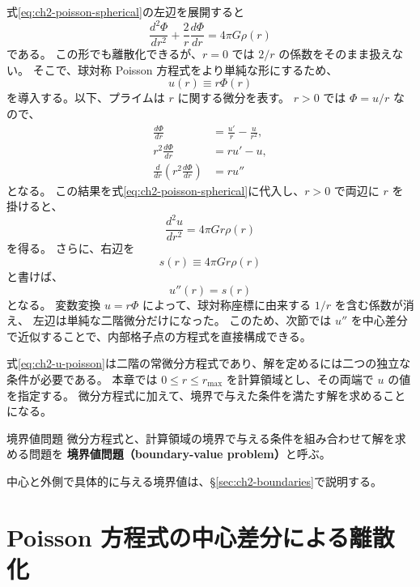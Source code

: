 式\eqref{eq:ch2-poisson-spherical}の左辺を展開すると
\begin{equation}
 \frac{d^2\Phi}{dr^2}
 +\frac{2}{r}\frac{d\Phi}{dr}
 =4\pi G\rho(r)
\end{equation}
である。
この形でも離散化できるが、$r=0$ では $2/r$ の係数をそのまま扱えない。
そこで、球対称 Poisson 方程式をより単純な形にするため、
\begin{equation}
 u(r)\equiv r\Phi(r)
\label{eq:ch2-u-def}
\end{equation}
を導入する。以下、プライムは $r$ に関する微分を表す。
$r>0$ では $\Phi=u/r$ なので、
\begin{align}
 \frac{d\Phi}{dr}
 &=\frac{u'}{r}-\frac{u}{r^2},\\
 r^2\frac{d\Phi}{dr}
 &=ru'-u,\\
 \frac{d}{dr}\left(r^2\frac{d\Phi}{dr}\right)
 &=ru''
\end{align}
となる。
この結果を式\eqref{eq:ch2-poisson-spherical}に代入し、$r>0$ で両辺に $r$ を掛けると、
\begin{equation}
 \frac{d^2u}{dr^2}=4\pi G r\rho(r)
\end{equation}
を得る。
さらに、右辺を
\begin{equation}
 s(r)\equiv4\pi G r\rho(r)
\label{eq:ch2-source-def}
\end{equation}
と書けば、
\begin{equation}
\boxed{
 u''(r)=s(r)
 }
\label{eq:ch2-u-poisson}
\end{equation}
となる。
変数変換 $u=r\Phi$ によって、球対称座標に由来する $1/r$ を含む係数が消え、
左辺は単純な二階微分だけになった。
このため、次節では $u''$ を中心差分で近似することで、内部格子点の方程式を直接構成できる。

式\eqref{eq:ch2-u-poisson}は二階の常微分方程式であり、解を定めるには二つの独立な条件が必要である。
本章では $0\le r\le r_{\max}$ を計算領域とし、その両端で $u$ の値を指定する。
微分方程式に加えて、境界で与えた条件を満たす解を求めることになる。

\begin{definitionbox}{境界値問題}
微分方程式と、計算領域の境界で与える条件を組み合わせて解を求める問題を
\textbf{境界値問題（boundary-value problem）}と呼ぶ。
\end{definitionbox}

中心と外側で具体的に与える境界値は、§\ref{sec:ch2-boundaries}で説明する。

\section{Poisson 方程式の中心差分による離散化}
\label{sec:ch2-second-difference}

